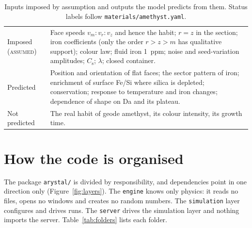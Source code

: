 \documentclass[11pt,a4paper]{article}
\newcommand{\code}[1]{\texttt{#1}}
\begin{document}
\begin{table}[ht]
\caption{Inputs imposed by assumption and outputs the model predicts from them. Status labels follow \code{materials/amethyst.yaml}.}\label{tab:imposed}
\small
\begin{tabularx}{\textwidth}{@{}lX@{}}
\toprule
Imposed (\textsc{assumed}) & Face speeds $v_m:v_r:v_z$ and hence the habit; $r=z$ in the section; iron coefficients (only the order $r>z>m$ has qualitative support); colour law; fluid iron \SI{1}{ppm}; noise and seed-variation amplitudes; $C_\mathrm{s}$; $\lambda$; closed container. \\
\addlinespace
Predicted & Position and orientation of flat faces; the sector pattern of iron; enrichment of surface Fe/Si where silica is depleted; conservation; response to temperature and iron changes; dependence of shape on Da and its plateau. \\
\addlinespace
Not predicted & The real habit of geode amethyst, its colour intensity, its growth time. \\
\bottomrule
\end{tabularx}
\end{table}

\section{How the code is organised}\label{sec:layout}

The package \code{arystal/} is divided by responsibility, and dependencies point in one direction only (Figure~\ref{fig:layers}). The \code{engine} knows only physics: it reads no files, opens no windows and creates no random numbers. The \code{simulation} layer configures and drives runs. The \code{server} drives the simulation layer and nothing imports the server. Table~\ref{tab:folders} lists each folder.
\end{document}
